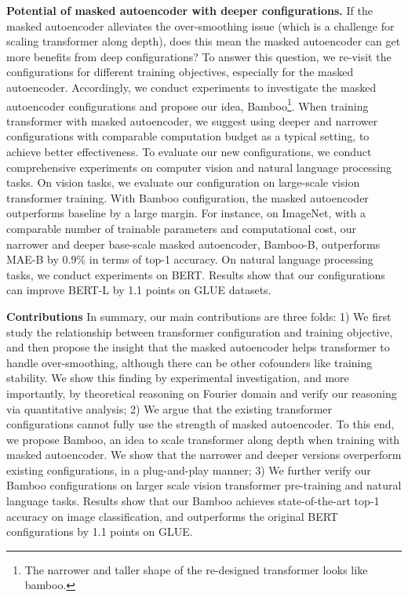 \documentclass{article}
\theoremstyle{plain}
\theoremstyle{definition}
\theoremstyle{remark}
\begin{document}
\textbf{Potential of masked autoencoder with deeper configurations.} If the masked autoencoder alleviates the over-smoothing issue (which is a challenge for scaling transformer along depth), does this mean the masked autoencoder can get more benefits from deep configurations? To answer this question, we re-visit the configurations for different training objectives, especially for the masked autoencoder. Accordingly, we conduct experiments to investigate the masked autoencoder configurations and propose our idea, Bamboo\footnote{The narrower and taller shape of the re-designed transformer looks like bamboo.}. When training transformer with masked autoencoder, we suggest using deeper and narrower configurations with comparable computation budget as a typical setting, to achieve better effectiveness. To evaluate our new configurations, we conduct comprehensive experiments on computer vision and natural language processing tasks. On vision tasks, we evaluate our configuration on large-scale vision transformer training. With Bamboo configuration, the masked autoencoder outperforms baseline by a large margin. For instance, on ImageNet, with a comparable number of trainable parameters and computational cost, our narrower and deeper base-scale masked autoencoder, Bamboo-B, outperforms MAE-B by 0.9\% in terms of top-1 accuracy. On natural language processing tasks, we conduct experiments on BERT. Results show that our configurations can improve BERT-L by 1.1 points on GLUE datasets.


\textbf{Contributions} In summary, our main contributions are three folds: 1) We first study the relationship between transformer configuration and training objective, and then propose the insight that the masked autoencoder helps transformer to handle over-smoothing, although there can be other cofounders like training stability. We show this finding by experimental investigation, and more importantly, by theoretical reasoning on Fourier domain and verify our reasoning via quantitative analysis;
2) We argue that the existing transformer configurations cannot fully use the strength of masked autoencoder. To this end, we propose Bamboo, an idea to scale transformer along depth when training with masked autoencoder. We show that the narrower and deeper versions overperform  existing configurations, in a plug-and-play manner; 
3) We further verify our Bamboo configurations on larger scale vision transformer pre-training and natural language tasks. Results show that our Bamboo achieves state-of-the-art top-1 accuracy on image classification, and outperforms the original BERT configurations by 1.1 points on GLUE.
\end{document}

